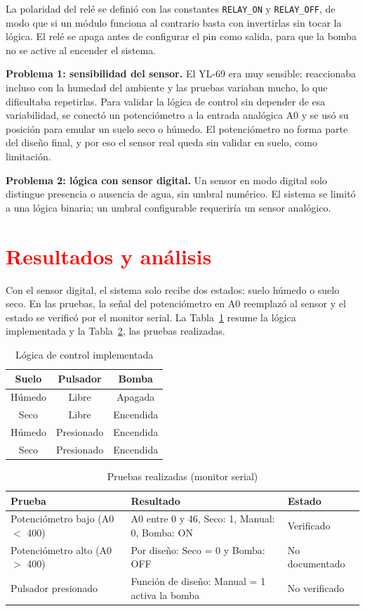 \documentclass[conference]{IEEEtran}
\let\oldsection\section
\renewcommand{\section}[1]{\oldsection{\textcolor{red}{#1}}}
\begin{document}
La polaridad del relé se definió con las constantes \texttt{RELAY\_ON} y \texttt{RELAY\_OFF}, de modo que si un módulo funciona al contrario basta con invertirlas sin tocar la lógica. El relé se apaga antes de configurar el pin como salida, para que la bomba no se active al encender el sistema.

\textbf{Problema 1: sensibilidad del sensor.} El YL-69 era muy sensible: reaccionaba incluso con la humedad del ambiente y las pruebas variaban mucho, lo que dificultaba repetirlas. Para validar la lógica de control sin depender de esa variabilidad, se conectó un potenciómetro a la entrada analógica A0 y se usó su posición para emular un suelo seco o húmedo. El potenciómetro no forma parte del diseño final, y por eso el sensor real queda sin validar en suelo, como limitación.

\textbf{Problema 2: lógica con sensor digital.} Un sensor en modo digital solo distingue presencia o ausencia de agua, sin umbral numérico. El sistema se limitó a una lógica binaria; un umbral configurable requeriría un sensor analógico.

\section{Resultados y análisis}
Con el sensor digital, el sistema solo recibe dos estados: suelo húmedo o suelo seco. En las pruebas, la señal del potenciómetro en A0 reemplazó al sensor y el estado se verificó por el monitor serial. La Tabla~\ref{tab:log} resume la lógica implementada y la Tabla~\ref{tab:pruebas}, las pruebas realizadas.

\begin{table}[h]\centering\caption{Lógica de control implementada}\label{tab:log}
\begin{tabular}{|c|c|c|}\hline
Suelo & Pulsador & Bomba\\\hline
Húmedo & Libre & Apagada\\
Seco & Libre & Encendida\\
Húmedo & Presionado & Encendida\\
Seco & Presionado & Encendida\\\hline
\end{tabular}\end{table}

\begin{table}[h]\centering\caption{Pruebas realizadas (monitor serial)}\label{tab:pruebas}
\begin{tabular}{|p{2.3cm}|p{3.3cm}|p{1.7cm}|}\hline
Prueba & Resultado & Estado\\\hline
Potenciómetro bajo (A0 $<$ 400) & A0 entre 0 y 46, Seco: 1, Manual: 0, Bomba: ON & Verificado\\\hline
Potenciómetro alto (A0 $>$ 400) & Por diseño: Seco = 0 y Bomba: OFF & No documentado\\\hline
Pulsador presionado & Función de diseño: Manual = 1 activa la bomba & No verificado\\\hline
\end{tabular}\end{table}
\end{document}
